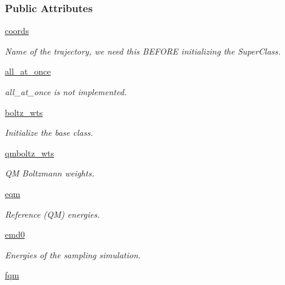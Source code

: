\subsubsection*{Public Attributes}
\begin{DoxyCompactItemize}
\item 
\hyperlink{classforcebalance_1_1amberio_1_1AbInitio__AMBER_adb0ed20ba62b97c3d5c0663ff6039746}{coords}
\begin{DoxyCompactList}\small\item\em Name of the trajectory, we need this B\-E\-F\-O\-R\-E initializing the Super\-Class. \end{DoxyCompactList}\item 
\hyperlink{classforcebalance_1_1amberio_1_1AbInitio__AMBER_a39462b1942be0f7fb6202862ad1afa9c}{all\-\_\-at\-\_\-once}
\begin{DoxyCompactList}\small\item\em all\-\_\-at\-\_\-once is not implemented. \end{DoxyCompactList}\item 
\hyperlink{classforcebalance_1_1abinitio_1_1AbInitio_ac442f096d11d0294235f2c8cbe1dcbb4}{boltz\-\_\-wts}
\begin{DoxyCompactList}\small\item\em Initialize the base class. \end{DoxyCompactList}\item 
\hyperlink{classforcebalance_1_1abinitio_1_1AbInitio_a06ec6b12d81791ca94f599f41e56335a}{qmboltz\-\_\-wts}
\begin{DoxyCompactList}\small\item\em Q\-M Boltzmann weights. \end{DoxyCompactList}\item 
\hyperlink{classforcebalance_1_1abinitio_1_1AbInitio_a64387fae9bdfb0d03ca6961e67c779be}{eqm}
\begin{DoxyCompactList}\small\item\em Reference (Q\-M) energies. \end{DoxyCompactList}\item 
\hyperlink{classforcebalance_1_1abinitio_1_1AbInitio_af928d333d14cb3b93f7db78530455873}{emd0}
\begin{DoxyCompactList}\small\item\em Energies of the sampling simulation. \end{DoxyCompactList}\item 
\hyperlink{classforcebalance_1_1abinitio_1_1AbInitio_af025be2ce97da3e8dc876d70e403f4ef}{fqm}

\end{DoxyCompactItemize}
